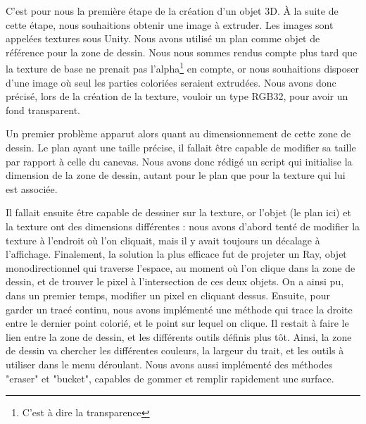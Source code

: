 \documentclass[a4paper,11pt]{article}
\begin{document}
			C'est pour nous la première étape de la création d'un objet 3D. À la suite de cette étape, nous souhaitions obtenir une image à extruder. Les images sont appelées textures sous Unity. Nous avons utilisé un plan comme objet de référence pour la zone de dessin. Nous nous sommes rendus compte plus tard que la texture de base ne prenait pas l'alpha\footnote{C'est à dire la transparence} en compte, or nous souhaitions disposer d'une image où seul les parties coloriées seraient extrudées. Nous avons donc précisé, lors de la création de la texture, vouloir un type RGB32, pour avoir un fond transparent.
			
			Un premier problème apparut alors quant au dimensionnement de cette zone de dessin. Le plan ayant une taille précise, il fallait être capable de modifier sa taille par rapport à celle du canevas. Nous avons donc rédigé un script qui initialise la dimension de la zone de dessin, autant pour le plan que pour la texture qui lui est associée.
			
			Il fallait ensuite être capable de dessiner sur la texture, or l'objet (le plan ici) et la texture ont des dimensions différentes : nous avons d'abord tenté de modifier la texture à l'endroit où l'on cliquait, mais il y avait toujours un décalage à l'affichage. Finalement, la solution la plus efficace fut de projeter un Ray, objet monodirectionnel qui traverse l'espace, au moment où l'on clique dans la zone de dessin, et de trouver le pixel à l'intersection de ces deux objets. On a ainsi pu, dans un premier temps, modifier un pixel en cliquant dessus. Ensuite, pour garder un tracé continu, nous avons implémenté une méthode qui trace la droite entre le dernier point colorié, et le point sur lequel on clique. Il restait à faire le lien entre la zone de dessin, et les différents outils définis plus tôt. Ainsi, la zone de dessin va chercher les différentes couleurs, la largeur du trait, et les outils à utiliser dans le menu déroulant. Nous avons aussi implémenté des méthodes "eraser" et "bucket", capables de gommer et remplir rapidement une surface.
			
\end{document}
